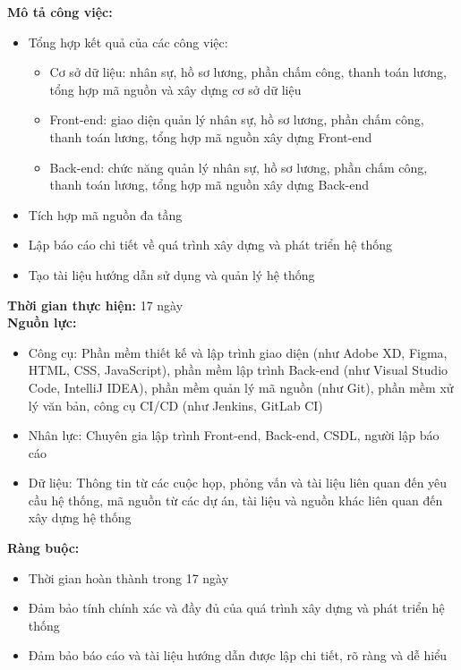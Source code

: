 {\begin{minipage}{\textwidth}
    \noindent \textbf{Mô tả công việc:}
    \begin{itemize}
        \item Tổng hợp kết quả của các công việc:
        \begin{itemize}
            \item Cơ sở dữ liệu: nhân sự, hồ sơ lương, phần chấm công, thanh toán lương, tổng hợp mã nguồn và xây dựng cơ sở dữ liệu
            \item Front-end: giao diện quản lý nhân sự, hồ sơ lương, phần chấm công, thanh toán lương, tổng hợp mã nguồn xây dựng Front-end
            \item Back-end: chức năng quản lý nhân sự, hồ sơ lương, phần chấm công, thanh toán lương, tổng hợp mã nguồn xây dựng Back-end
        \end{itemize}
        \item Tích hợp mã nguồn đa tầng
        \item Lập báo cáo chi tiết về quá trình xây dựng và phát triển hệ thống
        \item Tạo tài liệu hướng dẫn sử dụng và quản lý hệ thống
    \end{itemize}
    \vspace{0.5cm}
    \noindent \textbf{Thời gian thực hiện:} 17 ngày \\
    \noindent \textbf{Nguồn lực:}
    \begin{itemize}
        \item Công cụ: Phần mềm thiết kế và lập trình giao diện (như Adobe XD, Figma, HTML, CSS, JavaScript), phần mềm lập trình Back-end (như Visual Studio Code, IntelliJ IDEA), phần mềm quản lý mã nguồn (như Git), phần mềm xử lý văn bản, công cụ CI/CD (như Jenkins, GitLab CI)
        \item Nhân lực: Chuyên gia lập trình Front-end, Back-end, CSDL, người lập báo cáo
        \item Dữ liệu: Thông tin từ các cuộc họp, phỏng vấn và tài liệu liên quan đến yêu cầu hệ thống, mã nguồn từ các dự án, tài liệu và nguồn khác liên quan đến xây dựng hệ thống
    \end{itemize}
    \vspace{0.5cm}
    \noindent \textbf{Ràng buộc:}
    \begin{itemize}
        \item Thời gian hoàn thành trong 17 ngày
        \item Đảm bảo tính chính xác và đầy đủ của quá trình xây dựng và phát triển hệ thống
        \item Đảm bảo báo cáo và tài liệu hướng dẫn được lập chi tiết, rõ ràng và dễ hiểu

\end{itemize}
\end{minipage}}
